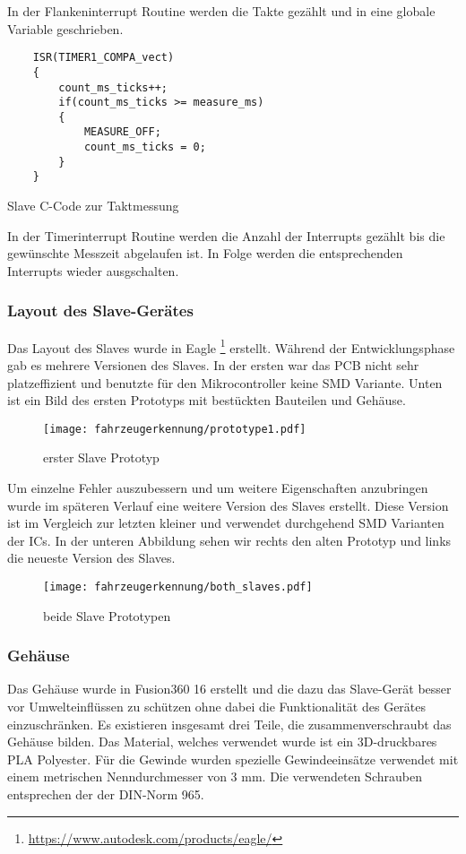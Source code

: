 In der Flankeninterrupt Routine werden die Takte gezählt und in eine globale Variable geschrieben.
\begin{listing}[H]
    \begin{verbatim}
    ISR(TIMER1_COMPA_vect)
    {
        count_ms_ticks++;
        if(count_ms_ticks >= measure_ms)
        {
            MEASURE_OFF;
            count_ms_ticks = 0;
        }
    }
    \end{verbatim}
    \caption{ Slave C-Code zur Taktmessung}
\end{listing}


In der Timerinterrupt Routine werden die Anzahl der Interrupts gezählt bis die gewünschte Messzeit
abgelaufen ist. In Folge werden die entsprechenden Interrupts wieder ausgschalten.
\subsubsection{Layout des Slave-Gerätes}

Das Layout des Slaves wurde in Eagle \footnote{\url{https://www.autodesk.com/products/eagle/}} erstellt. Während der Entwicklungsphase gab es mehrere
Versionen des Slaves. In der ersten war das PCB nicht sehr platzeffizient und benutzte für den
Mikrocontroller keine SMD Variante. Unten ist ein Bild des ersten Prototyps mit bestückten Bauteilen
und Gehäuse.

\begin{figure}[H]
    \centering
    \texttt{[image: fahrzeugerkennung/prototype1.pdf]}
    \caption{erster Slave Prototyp}
\end{figure}

Um einzelne Fehler auszubessern und um weitere Eigenschaften anzubringen wurde im späteren
Verlauf eine weitere Version des Slaves erstellt. Diese Version ist im Vergleich zur letzten kleiner
und verwendet durchgehend SMD Varianten der ICs. In der unteren Abbildung sehen wir rechts
den alten Prototyp und links die neueste Version des Slaves.

\begin{figure}[H]
    \centering
    \texttt{[image: fahrzeugerkennung/both\_slaves.pdf]}
    \caption{beide Slave Prototypen}
\end{figure}


\subsubsection{Gehäuse}

Das Gehäuse wurde in Fusion360 16 erstellt und die dazu das Slave-Gerät besser vor Umwelteinflüssen zu schützen ohne dabei die Funktionalität des Gerätes einzuschränken. Es existieren insgesamt
drei Teile, die zusammenverschraubt das Gehäuse bilden. Das Material, welches verwendet wurde
ist ein 3D-druckbares PLA Polyester. Für die Gewinde wurden spezielle Gewindeeinsätze verwendet
mit einem metrischen Nenndurchmesser von 3 mm. Die verwendeten Schrauben entsprechen der
der DIN-Norm 965.

